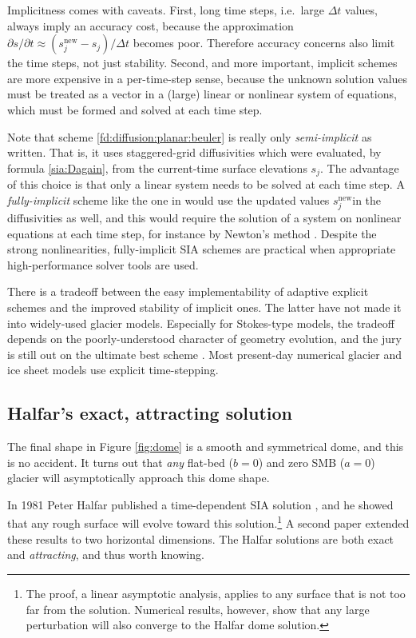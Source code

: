 \documentclass[letterpaper,final,12pt,reqno]{amsart}
\newcommand{\snew}{s^{\text{new}}}
\begin{document}
Implicitness comes with caveats.  First, long time steps, i.e.~large $\Delta t$ values, always imply an accuracy cost, because the approximation $\partial s/\partial t \approx (\snew_j - s_j)/\Delta t$ becomes poor.  Therefore accuracy concerns also limit the time steps, not just stability.  Second, and more important, implicit schemes are more expensive in a per-time-step sense, because the unknown solution values must be treated as a vector in a (large) linear or nonlinear system of equations, which must be formed and solved at each time step.

Note that scheme \eqref{fd:diffusion:planar:beuler} is really only \emph{semi-implicit} as written.  That is, it uses staggered-grid diffusivities which were evaluated, by formula \eqref{sia:Dagain}, from the current-time surface elevations $s_j$.  The advantage of this choice is that only a linear system needs to be solved at each time step.  A \emph{fully-implicit} scheme like the one in \cite{Bueler2016} would use the updated values $\snew_j$in the diffusivities as well, and this would require the solution of a system on nonlinear equations at each time step, for instance by Newton's method \cite{Bueler2021}.  Despite the strong nonlinearities, fully-implicit SIA schemes are practical when appropriate high-performance solver tools are used.

There is a tradeoff between the easy implementability of adaptive explicit schemes and the improved stability of implicit ones.  The latter have not made it into widely-used glacier models.  Especially for Stokes-type models, the tradeoff depends on the poorly-understood character of geometry evolution, and the jury is still out on the ultimate best scheme \cite{Bueler2023}.  Most present-day numerical glacier and ice sheet models use explicit time-stepping.

\subsection*{Halfar's exact, attracting solution}   The final shape in Figure \ref{fig:dome} is a smooth and symmetrical dome, and this is no accident.  It turns out that \emph{any} flat-bed ($b=0$) and zero SMB ($a=0$) glacier will asymptotically approach this dome shape.

In 1981 Peter Halfar published a time-dependent SIA solution \cite{Halfar1981}, and he showed that any rough surface will evolve toward this solution.\footnote{The proof, a linear asymptotic analysis, applies to any surface that is not too far from the solution.  Numerical results, however, show that any large perturbation will also converge to the Halfar dome solution.}  A second paper \cite{Halfar1983} extended these results to two horizontal dimensions.  The Halfar solutions are both exact and \emph{attracting}, and thus worth knowing.
\end{document}
